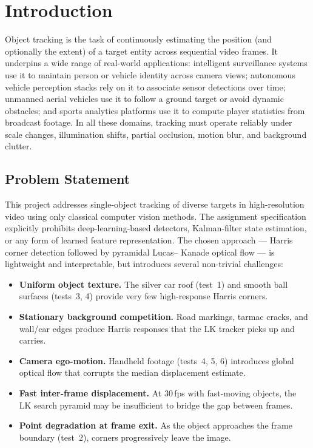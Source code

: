 \documentclass[12pt,a4paper]{article}
\begin{document}
\clearpage
\thispagestyle{plain}
\tableofcontents

\clearpage
{}
\setcounter{page}{1}

\section{Introduction}
Object tracking is the task of continuously estimating the position (and optionally the extent)
of a target entity across sequential video frames. It underpins a wide range of real-world
applications: intelligent surveillance systems use it to maintain person or vehicle identity across
camera views; autonomous vehicle perception stacks rely on it to associate sensor detections
over time; unmanned aerial vehicles use it to follow a ground target or avoid dynamic obstacles;
and sports analytics platforms use it to compute player statistics from broadcast footage. In all
these domains, tracking must operate reliably under scale changes, illumination shifts, partial
occlusion, motion blur, and background clutter.

\subsection{Problem Statement}
This project addresses single-object tracking of diverse targets in high-resolution video using
only classical computer vision methods. The assignment specification explicitly prohibits
deep-learning-based detectors, Kalman-filter state estimation, or any form of learned feature
representation. The chosen approach --- Harris corner detection followed by pyramidal Lucas--
Kanade optical flow --- is lightweight and interpretable, but introduces several non-trivial
challenges:
\begin{itemize}[leftmargin=1.5em]
  \item \textbf{Uniform object texture.} The silver car roof (test~1) and smooth ball surfaces
    (tests~3, 4) provide very few high-response Harris corners.
  \item \textbf{Stationary background competition.} Road markings, tarmac cracks, and
    wall/car edges produce Harris responses that the LK tracker picks up and carries.
  \item \textbf{Camera ego-motion.} Handheld footage (tests~4, 5, 6) introduces global
    optical flow that corrupts the median displacement estimate.
  \item \textbf{Fast inter-frame displacement.} At 30\,fps with fast-moving objects, the
    LK search pyramid may be insufficient to bridge the gap between frames.
  \item \textbf{Point degradation at frame exit.} As the object approaches the frame boundary
    (test~2), corners progressively leave the image.
\end{itemize}
\end{document}
